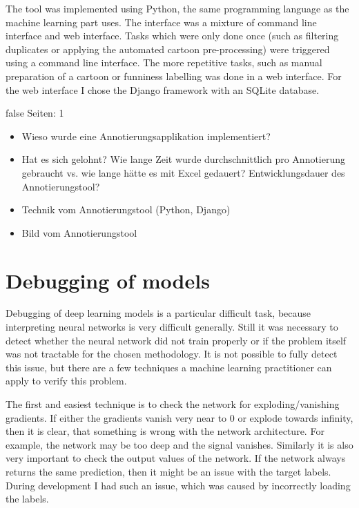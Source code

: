 \documentclass[draft,final,oneside]{vutinfth} %
\begin{document}
The tool was implemented using Python, the same programming language as the machine learning part uses. The interface was a mixture of command line interface and web interface. Tasks which were only done once (such as filtering duplicates or applying the automated cartoon pre-processing) were triggered using a command line interface. The more repetitive tasks, such as manual preparation of a cartoon or funniness labelling was done in a web interface. For the web interface I chose the Django framework with an SQLite database.


\if false
Seiten: 1

\begin{itemize}
\item Wieso wurde eine Annotierungsapplikation implementiert?
\item Hat es sich gelohnt? Wie lange Zeit wurde durchschnittlich pro Annotierung gebraucht vs. wie lange hätte es mit Excel gedauert? Entwicklungsdauer des Annotierungstool?
\item Technik vom Annotierungstool (Python, Django)
\item Bild vom Annotierungstool
\end{itemize}
\fi


\section{Debugging of models}

Debugging of deep learning models is a particular difficult task, because interpreting neural networks is very difficult generally. Still it was necessary to detect whether the neural network did not train properly or if the problem itself was not tractable for the chosen methodology. It is not possible to fully detect this issue, but there are a few techniques a machine learning practitioner can apply to verify this problem.

The first and easiest technique is to check the network for exploding/vanishing gradients. If either the gradients vanish very near to 0 or explode towards infinity, then it is clear, that something is wrong with the network architecture. For example, the network may be too deep and the signal vanishes. Similarly it is also very important to check the output values of the network. If the network always returns the same prediction, then it might be an issue with the target labels. During development I had such an issue, which was caused by incorrectly loading the labels.
\end{document}
